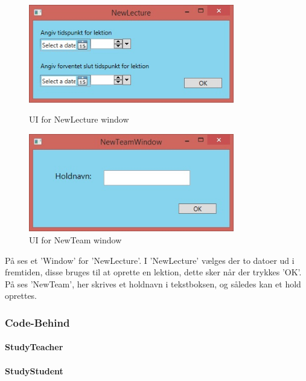 \begin{figure}[htbp]
\centering
\begin{minipage}{.5\textwidth}
  \centering
  \includegraphics[width=0.8\textwidth]{images/UI/NewLecture.jpg}
  \caption[UINewLecture]{UI for NewLecture window}
  \label{fig:NewLecture}
\end{minipage}%
\begin{minipage}{.5\textwidth}
  \centering
  \includegraphics[width=0.8\textwidth]{images/UI/NewTeam.jpg}
  \caption[UINewTeam]{UI for NewTeam window}
  \label{fig:NewTeam}
\end{minipage}%
\end{figure}

På  ses et 'Window' for 'NewLecture'. 
I 'NewLecture' vælges der to datoer ud i fremtiden, disse bruges til at oprette en lektion, dette sker når der trykkes 'OK'. 
På  ses 'NewTeam', her skrives et holdnavn i tekstboksen, og således kan et hold oprettes.

\subsubsection{Code-Behind}
\paragraph{StudyTeacher}
\paragraph{StudyStudent}
